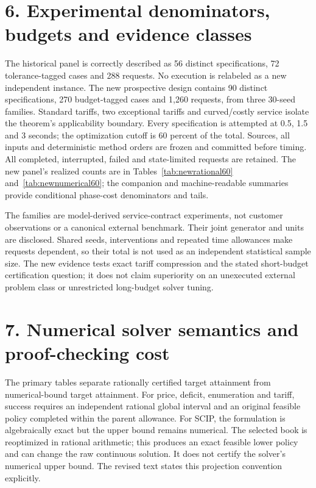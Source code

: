 \section*{6. Experimental denominators, budgets and evidence classes}
The historical panel is correctly described as 56 distinct specifications, 72 tolerance-tagged cases and 288 requests. No execution is relabeled as a new independent instance. The new prospective design contains 90 distinct specifications, 270 budget-tagged cases and 1,260 requests, from three 30-seed families. Standard tariffs, two exceptional tariffs and curved/costly service isolate the theorem's applicability boundary. Every specification is attempted at 0.5, 1.5 and 3 seconds; the optimization cutoff is 60 percent of the total. Sources, all inputs and deterministic method orders are frozen and committed before timing. All completed, interrupted, failed and state-limited requests are retained. The new panel's realized counts are in Tables~\ref{tab:newrational60} and~\ref{tab:newnumerical60}; the companion and machine-readable summaries provide conditional phase-cost denominators and tails.

The families are model-derived service-contract experiments, not customer observations or a canonical external benchmark. Their joint generator and units are disclosed. Shared seeds, interventions and repeated time allowances make requests dependent, so their total is not used as an independent statistical sample size. The new evidence tests exact tariff compression and the stated short-budget certification question; it does not claim superiority on an unexecuted external problem class or unrestricted long-budget solver tuning.

\section*{7. Numerical solver semantics and proof-checking cost}
The primary tables separate rationally certified target attainment from numerical-bound target attainment. For price, deficit, enumeration and tariff, success requires an independent rational global interval and an original feasible policy completed within the parent allowance. For SCIP, the formulation is algebraically exact but the upper bound remains numerical. The selected book is reoptimized in rational arithmetic; this produces an exact feasible lower policy and can change the raw continuous solution. It does not certify the solver's numerical upper bound. The revised text states this projection convention explicitly.

